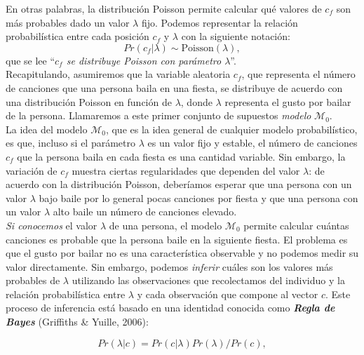 \documentclass{article}
\begin{document}
\indent En otras palabras, la distribución Poisson permite calcular qué valores de $c_f$ son más probables dado un valor $\lambda$ fijo.  Podemos representar la relación probabilística entre cada posición $c_f$ y $\lambda$ con la siguiente notación:
\begin{equation}
Pr(c_f|\lambda)\sim \mathrm{Poisson}(\lambda)\label{M0_1},
\end{equation}
\noindent que se lee ``\emph{$c_f$ se distribuye Poisson con parámetro $\lambda$}''.\\
\indent Recapitulando, asumiremos que la variable aleatoria $c_f$, que representa el número de canciones que una persona baila en una fiesta, se distribuye de acuerdo con una distribución Poisson en función de $\lambda$, donde $\lambda$ representa el gusto por bailar de la persona. Llamaremos a este primer conjunto de supuestos \emph{modelo} $\mathcal M_0$.\\
\indent La idea del modelo $\mathcal M_0$, que es la idea general de cualquier modelo probabilístico, es que, incluso si el parámetro $\lambda$ es un valor fijo y estable, el número de canciones $c_f$ que la persona baila en cada fiesta es una cantidad variable. Sin embargo, la variación de $c_f$ muestra ciertas regularidades que dependen del valor $\lambda$: de acuerdo con la distribución Poisson, deberíamos esperar que una persona con un valor $\lambda$ bajo baile por lo general pocas canciones por fiesta y que una persona con un valor $\lambda$ alto baile un número de canciones elevado.\\ 
\indent\emph{Si conocemos} el valor $\lambda$ de una persona, el modelo $\mathcal M_0$ permite calcular cuántas canciones es probable que la persona baile en la siguiente fiesta. El problema es que el gusto por bailar no es una característica observable y no podemos medir su valor directamente. Sin embargo, podemos \emph{inferir} cuáles son los valores más probables de $\lambda$ utilizando las observaciones que recolectamos del individuo y la relación probabilística entre $\lambda$ y cada observación que compone al vector $c$. Este proceso de inferencia está basado en una identidad conocida como  \emph{\textbf{Regla de Bayes}} (Griffiths \& Yuille, 2006):
 
\begin{equation}
Pr(\lambda|c)=Pr(c|\lambda)Pr(\lambda)/Pr(c),
\end{equation}
\end{document}
